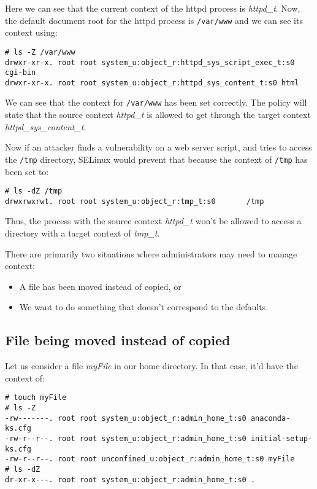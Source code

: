 \noindent
Here we can see that the current context of the httpd process is \textit{httpd\_t}. Now, the default document root for the httpd process is \verb|/var/www| and we can see its context using:

\vspace{-15pt}
\begin{verbatim}
# ls -Z /var/www
drwxr-xr-x. root root system_u:object_r:httpd_sys_script_exec_t:s0 cgi-bin
drwxr-xr-x. root root system_u:object_r:httpd_sys_content_t:s0 html
\end{verbatim}
\vspace{-10pt}

\noindent
We can see that the context for \verb|/var/www| has been set correctly. The policy will state that the source context \textit{httpd\_t} is allowed to get through the target context \textit{httpd\_sys\_content\_t}. 

Now if an attacker finds a vulnerability on a web server script, and tries to access the \verb|/tmp| directory, SELinux would prevent that because the context of \verb|/tmp| has been set to:

\vspace{-15pt}
\begin{verbatim}
# ls -dZ /tmp
drwxrwxrwt. root root system_u:object_r:tmp_t:s0       /tmp
\end{verbatim}
\vspace{-10pt}

\noindent
Thus, the process with the source context \textit{httpd\_t} won't be allowed to access a directory with a target context of \textit{tmp\_t}.

There are primarily two situations where administrators may need to manage context: 

\vspace{-10pt}
\begin{itemize}
	\item A file has been moved instead of copied, or
	\item We want to do something that doesn't correspond to the defaults.
\end{itemize}

\subsection{File being moved instead of copied}
Let us consider a file \textit{myFile} in our home directory. In that case, it'd have the context of:

\vspace{-15pt}
\begin{verbatim}
# touch myFile
# ls -Z
-rw-------. root root system_u:object_r:admin_home_t:s0 anaconda-ks.cfg
-rw-r--r--. root root system_u:object_r:admin_home_t:s0 initial-setup-ks.cfg
-rw-r--r--. root root unconfined_u:object_r:admin_home_t:s0 myFile
# ls -dZ
dr-xr-x---. root root system_u:object_r:admin_home_t:s0 .
\end{verbatim}
\vspace{-10pt}

